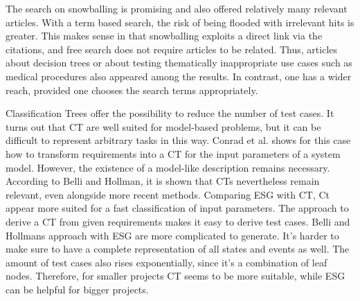 The search on snowballing is promising and also offered relatively many relevant articles. With a term based search, the risk of being flooded with irrelevant hits is greater. This makes sense in that snowballing exploits a direct link via the citations, and free search does not require articles to be related. Thus, articles about decision trees or about testing thematically inappropriate use cases such as medical procedures also appeared among the results. In contrast, one has a wider reach, provided one chooses the search terms appropriately.

Classification Trees offer the possibility to reduce the number of test cases. It turns out that CT are well suited for model-based problems, but it can be difficult to represent arbitrary tasks in this way. Conrad et al.\cite{Conrad2005} shows for this case how to transform requirements into a CT for the input parameters of a system model. However, the existence of a model-like description remains necessary. According to Belli and Hollman\cite{Belli2009}, it is shown that CTs nevertheless remain relevant, even alongside more recent methods. Comparing ESG with CT, Ct appear more suited for a fast classification of input parameters. The approach to derive a CT from given requirements makes it easy to derive test cases. Belli and Hollmans approach with ESG are more complicated to generate. It's harder to make sure to have a complete representation of all states and events as well. The amount of test cases also rises exponentially, since it's a combination of leaf nodes. Therefore, for smaller projects CT seems to be more suitable, while ESG can be helpful for bigger projects.







